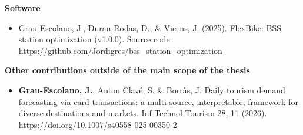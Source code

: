 \vspace{1em}
\textbf{Software}
\begin{itemize}
    \item Grau-Escolano, J., Duran-Rodas, D., \& Vicens, J. (2025). FlexBike: BSS station optimization (v1.0.0). Source code: \url{https://github.com/Jordigres/bss_station_optimization}
\end{itemize}


\vspace{1em}
\textbf{Other contributions outside of the main scope of the thesis}
\begin{itemize}
    \item\textbf{Grau-Escolano, J.}, Anton Clavé, S. \& Borràs, J. Daily tourism demand forecasting via card transactions: a multi-source, interpretable, framework for diverse destinations and markets. Inf Technol Tourism 28, 11 (2026). \url{https://doi.org/10.1007/s40558-025-00350-2}
\end{itemize}